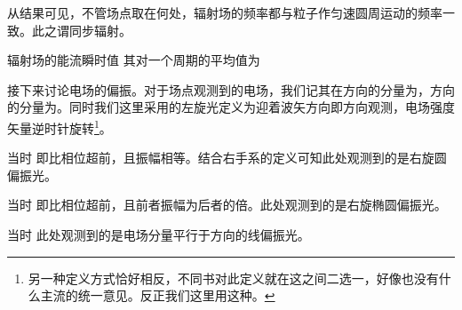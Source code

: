     从结果可见，不管场点取在何处，辐射场的频率都与粒子作匀速圆周运动的频率一致。此之谓同步辐射。
    
    辐射场的能流瞬时值
    其对一个周期的平均值为
    
    接下来讨论电场的偏振。对于场点观测到的电场，我们记其在\nota{\danwei{\theta}}方向的分量为，\nota{\danwei{\phi}}方向的分量为。同时我们这里采用的左旋光定义为迎着波矢方向即方向观测，电场强度矢量逆时针旋转\footnote{另一种定义方式恰好相反，不同书对此定义就在这之间二选一，好像也没有什么主流的统一意见。反正我们这里用这种。}。
    
    当时
    即比相位超前，且振幅相等。结合右手系的定义可知此处观测到的是右旋圆偏振光。
    
    当时
    即比相位超前，且前者振幅为后者的倍。此处观测到的是右旋椭圆偏振光。
    
    当时
    此处观测到的是电场分量平行于\nota{\danwei{\phi}}方向的线偏振光。
